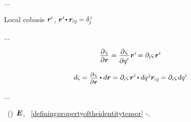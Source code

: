 ...

Local cobasis ${\bm{r}^i}$, ${\locationvector^i \hspace{-0.32ex} \dotp \locationvector_\differentialindex{\hspace{-0.1ex}j} \hspace{-0.22ex} = \delta_{\hspace{-0.15ex}j}^{\hspace{.2ex}i}}$

...

\begin{equation*}
\displaystyle\frac{\raisebox{-0.2em}{$\partial \hspace{.15ex} \varsigma$}}{\partial \locationvector}
=
\displaystyle\frac{\raisebox{-0.2em}{$\partial \hspace{.15ex} \varsigma$}}{\raisebox{-0.1em}{$\partial q^i$}} \hspace{.1ex} \locationvector^i \hspace{-0.25ex}
=
\partial_i \varsigma \hspace{.2ex} \locationvector^i
\end{equation*}

\begin{equation}
d \varsigma \hspace{-0.1ex}
=
\scalebox{0.9}{$ \displaystyle\frac{\raisebox{-0.2em}{$\partial \hspace{.15ex} \varsigma$}}{\partial \locationvector} $} \dotp d\locationvector \hspace{-0.1ex}
=
\partial_i \varsigma \hspace{.2ex} \locationvector^i \hspace{-0.15ex} \dotp dq^{\hspace{.12ex}j} \hspace{-0.1ex} \locationvector_\differentialindex{\hspace{-0.1ex}j} \hspace{-0.2ex}
=
\partial_i \varsigma \hspace{.15ex} dq^i
\end{equation}

...

~()~${\hspace{-0.1ex}\bm{E}}$,
~\eqref{definingpropertyoftheidentitytensor}
\dotproductinquotes\hbox{-},


